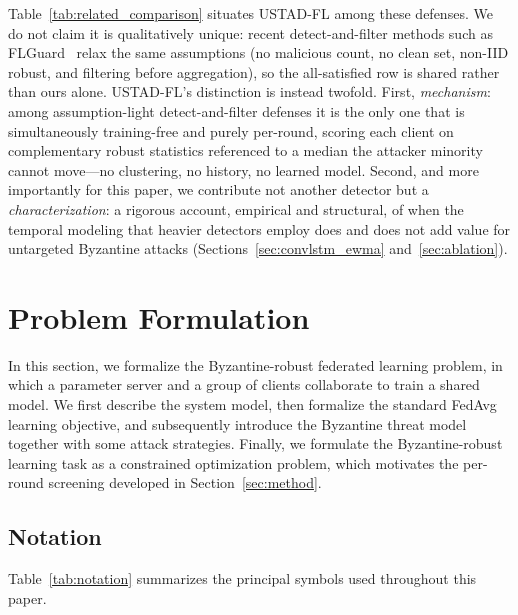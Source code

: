 \documentclass[journal]{IEEEtran}
\begin{document}
Table~\ref{tab:related_comparison} situates USTAD-FL among these defenses. We do not claim it is qualitatively unique: recent detect-and-filter methods such as FLGuard~\cite{lee2023flguard} relax the same assumptions (no malicious count, no clean set, non-IID robust, and filtering before aggregation), so the all-satisfied row is shared rather than ours alone. USTAD-FL's distinction is instead twofold. First, \emph{mechanism}: among assumption-light detect-and-filter defenses it is the only one that is simultaneously training-free and purely per-round, scoring each client on complementary robust statistics referenced to a median the attacker minority cannot move---no clustering, no history, no learned model. Second, and more importantly for this paper, we contribute not another detector but a \emph{characterization}: a rigorous account, empirical and structural, of when the temporal modeling that heavier detectors employ does and does not add value for untargeted Byzantine attacks (Sections~\ref{sec:convlstm_ewma} and~\ref{sec:ablation}).

\section{Problem Formulation}
\label{sec:formulation}

In this section, we formalize the Byzantine-robust federated learning problem, in which a parameter server and a group of clients collaborate to train a shared model. We first describe the system model, then formalize the standard FedAvg learning objective, and subsequently introduce the Byzantine threat model together with some attack strategies. Finally, we formulate the Byzantine-robust learning task as a constrained optimization problem, which motivates the per-round screening developed in Section~\ref{sec:method}.

\subsection{Notation}

Table~\ref{tab:notation} summarizes the principal symbols used throughout this paper.
\end{document}
